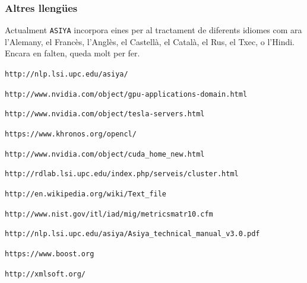 \documentclass[11pt,a4paper]{article}
\begin{document}
\subsubsection{Altres llengües}

Actualment \texttt{ASIYA} incorpora eines per al tractament de diferents idiomes com ara l'Alemany, el Francès, l'Anglès, el Castellà, el Català, el Rus, el Txec, o l'Hindi.
\\

Encara en falten, queda molt per fer.

\newpage
\begin{thebibliography}{10}
\texttt{http://nlp.lsi.upc.edu/asiya/}

\texttt{http://www.nvidia.com/object/gpu-applications-domain.html}

\texttt{http://www.nvidia.com/object/tesla-servers.html}

\texttt{https://www.khronos.org/opencl/}

\texttt{http://www.nvidia.com/object/cuda\_home\_new.html}


\texttt{http://rdlab.lsi.upc.edu/index.php/serveis/cluster.html}

\texttt{http://en.wikipedia.org/wiki/Text\_file}

\texttt{http://www.nist.gov/itl/iad/mig/metricsmatr10.cfm}

\texttt{http://nlp.lsi.upc.edu/asiya/Asiya\_technical\_manual\_v3.0.pdf}

\texttt{https://www.boost.org}

\texttt{http://xmlsoft.org/}

\end{thebibliography}
\end{document}
